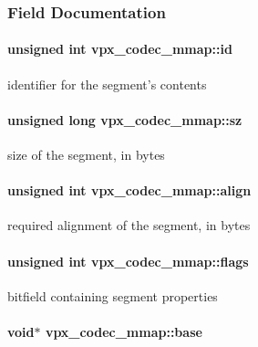 \subsubsection{Field Documentation}
\hypertarget{structvpx__codec__mmap_a83f482a223678a60c22362f44e36e8c8}{
\paragraph[{id}]{\setlength{\rightskip}{0pt plus 5cm}unsigned int vpx\-\_\-codec\-\_\-mmap\-::id}}\label{structvpx__codec__mmap_a83f482a223678a60c22362f44e36e8c8}
identifier for the segment's contents \hypertarget{structvpx__codec__mmap_ae6822e6985cef61d2341a8d429bea079}{
\paragraph[{sz}]{\setlength{\rightskip}{0pt plus 5cm}unsigned long vpx\-\_\-codec\-\_\-mmap\-::sz}}\label{structvpx__codec__mmap_ae6822e6985cef61d2341a8d429bea079}
size of the segment, in bytes \hypertarget{structvpx__codec__mmap_a7875d3878f1d58c205f396c1f696987b}{
\paragraph[{align}]{\setlength{\rightskip}{0pt plus 5cm}unsigned int vpx\-\_\-codec\-\_\-mmap\-::align}}\label{structvpx__codec__mmap_a7875d3878f1d58c205f396c1f696987b}
required alignment of the segment, in bytes \hypertarget{structvpx__codec__mmap_afd7f8fed412b7bb524bed8e6ed14400d}{
\paragraph[{flags}]{\setlength{\rightskip}{0pt plus 5cm}unsigned int vpx\-\_\-codec\-\_\-mmap\-::flags}}\label{structvpx__codec__mmap_afd7f8fed412b7bb524bed8e6ed14400d}
bitfield containing segment properties \hypertarget{structvpx__codec__mmap_a0f7580ef4f5680df53c1ef3bd5f66d01}{
\paragraph[{base}]{\setlength{\rightskip}{0pt plus 5cm}void$\ast$ vpx\-\_\-codec\-\_\-mmap\-::base}}\label{structvpx__codec__mmap_a0f7580ef4f5680df53c1ef3bd5f66d01}
